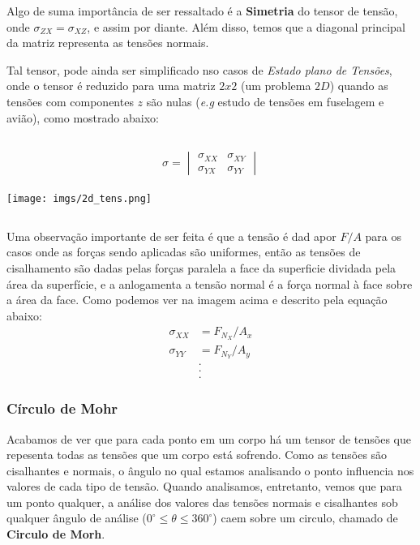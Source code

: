 \documentclass{article}
\begin{document}
Algo de suma importância de ser ressaltado é a \textbf{Simetria} do tensor de tensão, onde $\sigma_{ZX} = \sigma_{XZ}$, e assim por diante. Além disso, temos que a diagonal principal da matriz representa as tensões normais.

Tal tensor, pode ainda ser simplificado nso casos de \emph{Estado plano de Tensões}, onde o tensor é reduzido para uma matriz $2x2$ (um problema $2D$) quando as tensões com componentes $z$ são nulas (\emph{e.g} estudo de tensões em fuselagem e avião), como mostrado abaixo:

$$$$
\begin{minipage}{.5\textwidth}
    \begin{align*}
        \sigma = \begin{vmatrix}
                     \sigma_{XX} & \sigma_{XY} \\
                     \sigma_{YX} & \sigma_{YY}
                 \end{vmatrix}
    \end{align*}
\end{minipage}
\begin{minipage}{.5\textwidth}
    \texttt{[image: imgs/2d\_tens.png]}
\end{minipage}
$$$$

Uma observação importante de ser feita é que a tensão é dad apor $F/A$ para os casos onde as forças sendo aplicadas são uniformes, então as tensões de cisalhamento são dadas pelas forças paralela a face da superficie dividada pela área da superfície, e a anlogamenta a tensão normal é a força normal à face sobre a área da face. Como podemos ver na imagem acima e descrito pela equação abaixo:
\begin{align*}
    \sigma_{XX} & = F_{N_X} / A_x \\
    \sigma_{YY} & = F_{N_Y} / A_y \\
                & .               \\ &. \\ &.
\end{align*}

\newpage
\subsubsection*{Círculo de Mohr}
Acabamos de ver que para cada ponto em um corpo há um tensor de tensões que repesenta todas as tensões que um corpo está sofrendo. Como as tensões são cisalhantes e normais, o ângulo no qual estamos analisando o ponto influencia nos valores de cada tipo de tensão. Quando analisamos, entretanto, vemos que para um ponto qualquer, a análise dos valores das tensões normais e cisalhantes sob qualquer ângulo de análise ($0^\circ \le \theta \le 360^\circ $) caem sobre um circulo, chamado de \textbf{Circulo de Morh}.
\end{document}
